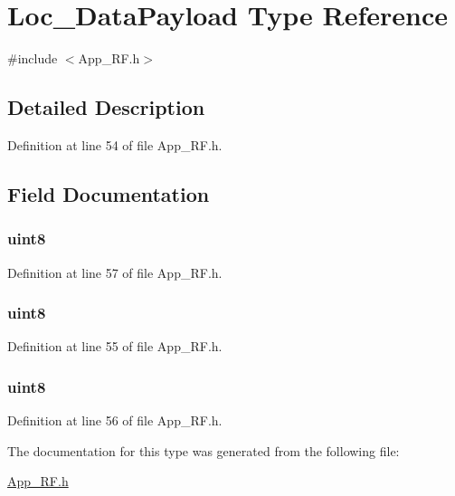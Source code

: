 \hypertarget{type_loc___data_payload}{
\section{Loc\_\-DataPayload Type Reference}
\label{type_loc___data_payload}
}


{\ttfamily \#include $<$App\_\-RF.h$>$}

\par
\par


\subsection{Detailed Description}


Definition at line 54 of file App\_\-RF.h.



\subsection{Field Documentation}
\hypertarget{type_loc___data_payload_ad9c125192aa660ce1f335e93122b5d52}{
\subsubsection[{Blind\_\-Node}]{ {\bfseries uint8 } }}
\label{type_loc___data_payload_ad9c125192aa660ce1f335e93122b5d52}


Definition at line 57 of file App\_\-RF.h.

\hypertarget{type_loc___data_payload_a0b368d20ae77d81b17d39d88e68b8b5d}{
\subsubsection[{X\_\-Coord}]{ {\bfseries uint8 } }}
\label{type_loc___data_payload_a0b368d20ae77d81b17d39d88e68b8b5d}


Definition at line 55 of file App\_\-RF.h.

\hypertarget{type_loc___data_payload_ac6e50173777219aa209238531119fb2b}{
\subsubsection[{Y\_\-Coord}]{ {\bfseries uint8 } }}
\label{type_loc___data_payload_ac6e50173777219aa209238531119fb2b}


Definition at line 56 of file App\_\-RF.h.



The documentation for this type was generated from the following file:\begin{DoxyCompactItemize}
\item 
\hyperlink{_app___r_f_8h}{App\_\-RF.h}\end{DoxyCompactItemize}
